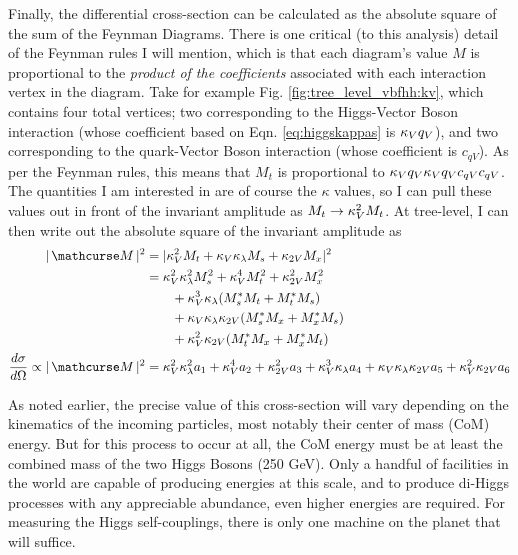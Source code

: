     Finally, the differential cross-section can be calculated as the absolute square of the sum of the Feynman Diagrams.
    There is one critical (to this analysis) detail of the Feynman rules I will mention,
        which is that each diagram's value $M$ is proportional to the \textit{product of the coefficients}
        associated with each interaction vertex in the diagram.
    Take for example Fig. \ref{fig:tree_level_vbfhh:kv}, which contains four total vertices;
        two corresponding to the Higgs-Vector Boson interaction (whose coefficient based on Eqn. \ref{eq:higgskappas} is $\kappa_{V} q_V$),
        and two corresponding to the quark-Vector Boson interaction (whose coefficient is $c_{qV}$).
    As per the Feynman rules, this means that $M_t$ is proportional to $\kappa_{V} q_V \kappa_{V} q_V c_{qV} c_{qV}$.
    The quantities I am interested in are of course the $\kappa$ values,
        so I can pull these values out in front of the invariant amplitude as $M_t \rightarrow \kappa_{V}^2 M_t$.
    At tree-level, I can then write out the absolute square of the invariant amplitude as
    \begin{equation} \begin{split} \label{eq:tree_level_invamp}
        |\invAmp|^2 &= |  \kv^2 M_t + \kv \kl M_s + \kvv M_x |^2
        \\&= \kv^2 \kl^2 M_s^2 + \kv^4 M_t^2 + \kvv^2 M_x^2 
            \\&\qquad + \kv^3 \kl (M_s^* M_t + M_t^* M_s) 
            \\&\qquad + \kv \kl \kvv (M_s^* M_x + M_x^* M_s ) 
            \\&\qquad + \kv^2 \kvv (M_t^* M_x + M_x^* M_t )
        \\\dXsec \propto |\invAmp|^2 &= \kv^2 \kl^2 a_1 + \kv^4 a_2 + \kvv^2 a_3 + \kv^3 \kl a_4 + \kv \kl \kvv a_5 + \kv^2 \kvv a_6
    \end{split} \end{equation}

    As noted earlier, the precise value of this cross-section will vary depending on the kinematics of the incoming particles,
        most notably their center of mass (CoM) energy.
    But for this process to occur at all, the CoM energy must be at least the combined mass of the two Higgs Bosons (250 GeV).
    Only a handful of facilities in the world are capable of producing energies at this scale,
        and to produce di-Higgs processes with any appreciable abundance,
        even higher energies are required.
    For measuring the Higgs self-couplings, there is only one machine on the planet that will suffice.


